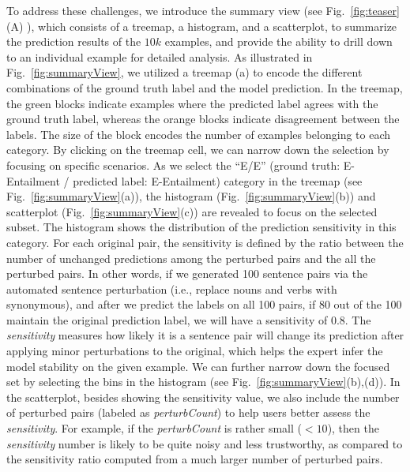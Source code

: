 To address these challenges, we introduce the summary view (see Fig.~\ref{fig:teaser}(A) ), which consists of a treemap, a histogram, and a scatterplot, to summarize the prediction results of the $10k$ examples, and provide the ability to drill down to an individual example for detailed analysis.
As illustrated in Fig.~\ref{fig:summaryView}, we utilized a treemap (a) to encode the different combinations of the ground truth label and the model prediction. In the treemap, the green blocks indicate examples where the predicted label agrees with the ground truth label, whereas the orange blocks indicate disagreement between the labels. The size of the block encodes the number of examples belonging to each category.
%
By clicking on the treemap cell, we can narrow down the selection by focusing on specific scenarios.
%
As we select the ``E/E'' (ground truth: E-Entailment / predicted label: E-Entailment) category in the treemap (see Fig.~\ref{fig:summaryView}(a)), the histogram (Fig.~\ref{fig:summaryView}(b)) and scatterplot  (Fig.~\ref{fig:summaryView}(c)) are revealed to focus on the selected subset. The histogram shows the distribution of the prediction sensitivity in this category. For each original pair, the sensitivity is defined by the ratio between the number of unchanged predictions among the perturbed pairs and the all the perturbed pairs. In other words, if we generated 100 sentence pairs via the automated sentence perturbation (i.e., replace nouns and verbs with synonymous), and after we predict the labels on all 100 pairs, if 80 out of the 100 maintain the original prediction label, we will have a sensitivity of 0.8. The \emph{sensitivity} measures how likely it is a sentence pair will change its prediction after applying minor perturbations to the original, which helps the expert infer the model stability on the given example.
%
We can further narrow down the focused set by selecting the bins in the histogram (see Fig.~\ref{fig:summaryView}(b),(d)). 
%
In the scatterplot, besides showing the sensitivity value, we also include the number of perturbed pairs (labeled as \emph{perturbCount}) to help users better assess the \emph{sensitivity}. For example, if the \emph{perturbCount} is rather small ($<10$), then the \emph{sensitivity} number is likely to be quite noisy and less trustworthy, as compared to the sensitivity ratio computed from a much larger number of perturbed pairs.


